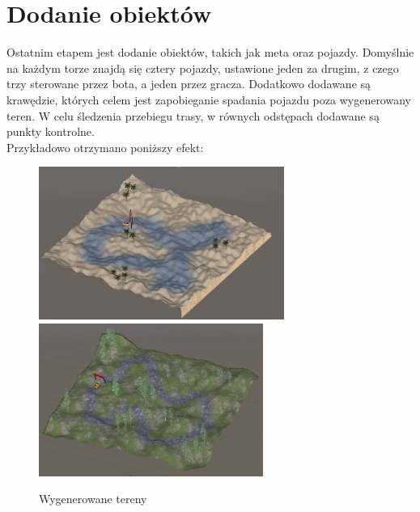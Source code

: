 \section{Dodanie obiektów}
Ostatnim etapem jest dodanie obiektów, takich jak meta oraz pojazdy. Domyślnie na każdym torze znajdą się cztery pojazdy, ustawione jeden za drugim, z czego trzy sterowane przez bota, a jeden przez gracza. Dodatkowo dodawane są krawędzie, których celem jest zapobieganie spadania pojazdu poza wygenerowany teren. W celu śledzenia przebiegu trasy, w równych odstępach dodawane są punkty kontrolne.\\
Przykładowo otrzymano poniższy efekt:
\begin{figure}[h]
        \centering
        \includegraphics[height=5cm]{figures/terrains_2.png}
    \endminipage\hfill
        \centering
        \includegraphics[height=5cm]{figures/terrains_1.png}
    \endminipage
    \caption{Wygenerowane tereny}
    \label{table}
\end{figure}
\clearpage